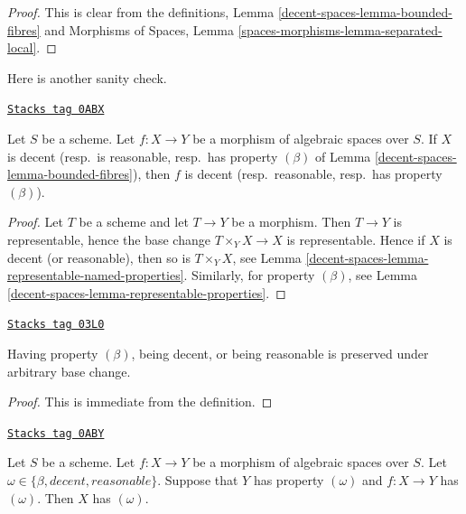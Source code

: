 \begin{proof}
This is clear from the definitions,
Lemma \ref{decent-spaces-lemma-bounded-fibres}
and
Morphisms of Spaces,
Lemma \ref{spaces-morphisms-lemma-separated-local}.
\end{proof}

Here is another sanity check.

\begin{lemma}
\label{decent-spaces-lemma-property-for-morphism-out-of-property}
\href{https://stacks.math.columbia.edu/tag/0ABX}{\texttt{Stacks tag 0ABX}}

Let $S$ be a scheme. Let $f : X \to Y$ be a morphism of algebraic
spaces over $S$. If $X$ is decent (resp.\ is reasonable, resp.\ has property
$(\beta)$ of Lemma \ref{decent-spaces-lemma-bounded-fibres}), then $f$ is
decent (resp.\ reasonable, resp.\ has property $(\beta)$).
\end{lemma}

\begin{proof}
Let $T$ be a scheme and let $T \to Y$ be a morphism. Then $T \to Y$
is representable, hence the base change $T \times_Y X \to X$ is representable.
Hence if $X$ is decent (or reasonable), then so is $T \times_Y X$, see
Lemma \ref{decent-spaces-lemma-representable-named-properties}.
Similarly, for property $(\beta)$, see
Lemma \ref{decent-spaces-lemma-representable-properties}.
\end{proof}

\begin{lemma}
\label{decent-spaces-lemma-base-change-relative-conditions}
\href{https://stacks.math.columbia.edu/tag/03L0}{\texttt{Stacks tag 03L0}}

Having property $(\beta)$, being decent, or being reasonable
is preserved under arbitrary base change.
\end{lemma}

\begin{proof}
This is immediate from the definition.
\end{proof}

\begin{lemma}
\label{decent-spaces-lemma-property-over-property}
\href{https://stacks.math.columbia.edu/tag/0ABY}{\texttt{Stacks tag 0ABY}}

Let $S$ be a scheme.
Let $f : X \to Y$ be a morphism of algebraic spaces over $S$.
Let $\omega \in \{\beta, decent, reasonable\}$.
Suppose that $Y$ has property $(\omega)$ and $f : X \to Y$ has $(\omega)$.
Then $X$ has $(\omega)$.
\end{lemma}

